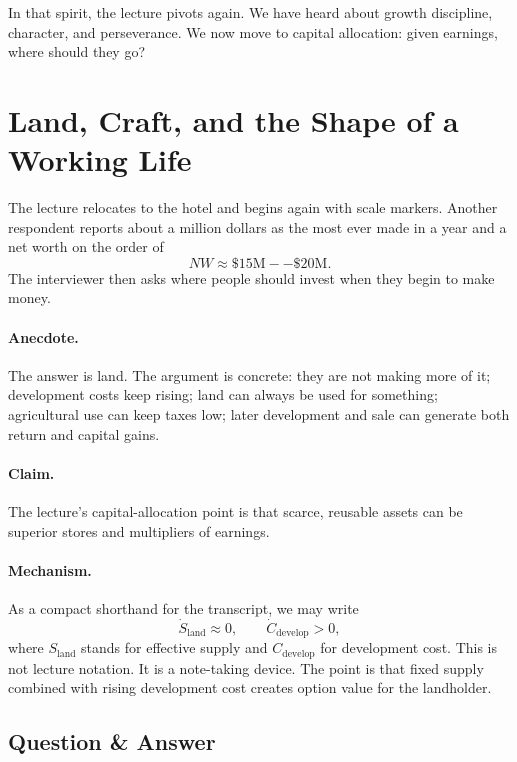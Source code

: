In that spirit, the lecture pivots again. We have heard about growth discipline, character, and perseverance. We now move to capital allocation: given earnings, where should they go?

\section{Land, Craft, and the Shape of a Working Life}

The lecture relocates to the hotel and begins again with scale markers. Another respondent reports about a million dollars as the most ever made in a year and a net worth on the order of
\begin{equation}
NW \approx \$15\text{M}--\$20\text{M}.
\end{equation}
The interviewer then asks where people should invest when they begin to make money.

\paragraph{Anecdote.}
The answer is land. The argument is concrete: they are not making more of it; development costs keep rising; land can always be used for something; agricultural use can keep taxes low; later development and sale can generate both return and capital gains.

\paragraph{Claim.}
The lecture's capital-allocation point is that scarce, reusable assets can be superior stores and multipliers of earnings.

\paragraph{Mechanism.}
As a compact shorthand for the transcript, we may write
\begin{equation}
\dot S_{\mathrm{land}} \approx 0,
\qquad
\dot C_{\mathrm{develop}} > 0,
\end{equation}
where \(S_{\mathrm{land}}\) stands for effective supply and \(C_{\mathrm{develop}}\) for development cost. This is not lecture notation. It is a note-taking device. The point is that fixed supply combined with rising development cost creates option value for the landholder.

\subsection{Question \& Answer}

